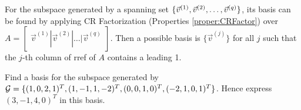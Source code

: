\begin{proper}
\label{proper:findgenbasis}
For the subspace generated by a spanning set $\{\vec{v}^{(1)}, \vec{v}^{(2)}, \ldots, \\ \vec{v}^{(q)}\}$, its basis can be found by applying CR Factorization (Properties \ref{proper:CRFactor}) over $A = \begin{bmatrix}
\vec{v}^{(1)}|\vec{v}^{(2)}|\ldots|\vec{v}^{(q)}    
\end{bmatrix}$. Then a possible basis is $\{\vec{v}^{(j)}\}$ for all $j$ such that the $j$-th column of rref of $A$ contains a leading 1.
\end{proper}

\begin{exmp}
\label{exmp:gentrimbasis}
Find a basis for the subspace generated by $\mathcal{G} = \{(1,0,2,1)^T, \\ (1,-1,1,-2)^T, (0,0,1,0)^T, (-2,1,0,1)^T\}$. Hence express $(3,-1,4,0)^T$ in this basis. 
\end{exmp}
